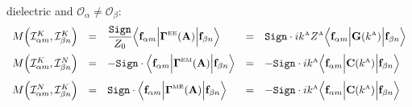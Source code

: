 \documentclass[dvips,letterpaper]{article}
\newcommand{\BG}{\boldsymbol{\Gamma}}
\begin{document}
\begin{enumerate}
{               dielectric and $\mathcal{O}_\alpha \ne \mathcal{O}_\beta$:}
$$\begin{array}{lclcl}
 M\Big( \mathcal{I}^K_{\alpha m}, \mathcal{I}^K_{\beta n} \Big) 
  &=& 
  \displaystyle{ \frac{\texttt{Sign}}{Z_0} 
                 \Big\langle \vb f_{\alpha m} 
                 \Big| \BG\supt{EE}(\vb A) \Big|
                 \vb f_{\beta n} 
                 \Big\rangle
               }
  &=&
  \displaystyle{ \texttt{Sign}\cdot ik\supt{A} Z\supt{A}
                 \Big\langle \vb f_{\alpha m} 
                 \Big| \vb G(k\supt{A}) \Big|
                 \vb f_{\beta n} 
                 \Big\rangle
               }
\\[10pt]
 M\Big( \mathcal{I}^K_{\alpha m}, \mathcal{I}^N_{\beta n} \Big) 
  &=&
  \displaystyle{ -\texttt{Sign}\cdot
                 \Big\langle 
                 \vb f_{\alpha m} 
                 \Big|\BG\supt{EM}(\vb A) \Big|
                 \vb f_{\beta n} 
                 \Big\rangle
               }
  &=&
  \displaystyle{ -\texttt{Sign}\cdot ik\supt{A}
                  \Big\langle 
                  \vb f_{\alpha m} 
                  \Big| \vb C(k\supt{A})\Big|
                  \vb f_{\beta n} 
                  \Big\rangle
               }
\\[10pt]
 M\Big( \mathcal{I}^N_{\alpha m}, \mathcal{I}^K_{\beta n} \Big) 
  &=&
  \displaystyle{ \texttt{Sign}\cdot
                 \Big\langle 
                 \vb f_{\alpha m} 
                 \Big|\BG\supt{ME}(\vb A) \Big|
                 \vb f_{\beta n} 
                 \Big\rangle
               }
  &=&
  \displaystyle{ -\texttt{Sign}\cdot ik\supt{A}
                  \Big\langle 
                  \vb f_{\alpha m} 
                  \Big| \vb C(k\supt{A})\Big|
                  \vb f_{\beta n} 
                  \Big\rangle
               }
\\[10pt]

\end{array}$$
\end{enumerate}
\end{document}
